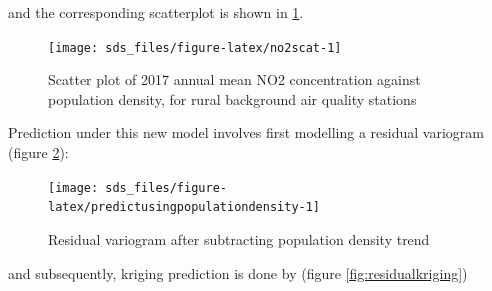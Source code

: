 \documentclass[]{book}
\newenvironment{Shaded}{\begin{snugshade}}{\end{snugshade}}
\newcommand{\CommentTok}[1]{\textcolor[rgb]{0.56,0.35,0.01}{\textit{#1}}}
\newcommand{\DataTypeTok}[1]{\textcolor[rgb]{0.13,0.29,0.53}{#1}}
\newcommand{\DecValTok}[1]{\textcolor[rgb]{0.00,0.00,0.81}{#1}}
\newcommand{\KeywordTok}[1]{\textcolor[rgb]{0.13,0.29,0.53}{\textbf{#1}}}
\newcommand{\NormalTok}[1]{#1}
\newcommand{\OperatorTok}[1]{\textcolor[rgb]{0.81,0.36,0.00}{\textbf{#1}}}
\newcommand{\StringTok}[1]{\textcolor[rgb]{0.31,0.60,0.02}{#1}}
\begin{document}
and the corresponding scatterplot is shown in \ref{fig:no2scat}.

\begin{figure}

{\centering \texttt{[image: sds\_files/figure-latex/no2scat-1]} 

}

\caption{Scatter plot of 2017 annual mean NO2 concentration against population density, for rural background air quality stations}\label{fig:no2scat}
\end{figure}

Prediction under this new model involves first modelling a residual
variogram (figure \ref{fig:predictusingpopulationdensity}):

\begin{Shaded}
\end{Shaded}

\begin{figure}

{\centering \texttt{[image: sds\_files/figure-latex/predictusingpopulationdensity-1]} 

}

\caption{Residual variogram after subtracting population density trend}\label{fig:predictusingpopulationdensity}
\end{figure}

and subsequently, kriging prediction is done by (figure \ref{fig:residualkriging})

\begin{Shaded}
\end{Shaded}
\end{document}
